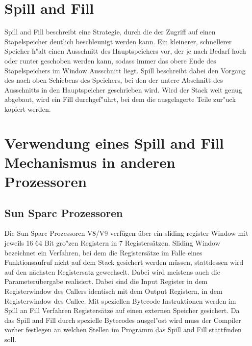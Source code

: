 \section{Spill and Fill}

Spill and Fill beschreibt eine Strategie, durch die der Zugriff auf einen Stapelspeicher deutlich beschleunigt werden kann. Ein kleinerer, schnellerer Speicher h"alt einen Ausschnitt des Hauptspeichers vor, der je nach Bedarf hoch oder runter geschoben werden kann, sodass immer das obere Ende des Stapelspeichers im Window Ausschnitt liegt. Spill beschreibt dabei den Vorgang des nach oben Schiebens des Speichers, bei den der untere Abschnitt des Ausschnitts in den Hauptspeicher geschrieben wird. Wird der Stack weit genug abgebaut, wird ein Fill durchgef"uhrt, bei dem die ausgelagerte Teile zur"uck kopiert werden.  


\section{Verwendung eines Spill and Fill Mechanismus in anderen Prozessoren}
\subsection{Sun Sparc Prozessoren}
Die Sun Sparc Prozessoren V8/V9 verf\"ugen \"uber ein sliding register Window mit jeweils 16 64 Bit gro"zen Registern in 7 Registers\"atzen. Sliding Window bezeichnet ein Verfahren, bei dem die Registers\"atze im Falle eines Funktionsaufruf nicht auf dem Stack gesichert werden m\"ussen, stattdessen wird auf den n\"achsten Registersatz gewechselt. Dabei wird meistens auch die Parameter\"ubergabe realisiert. Dabei sind die Input Register in dem Registerwindow des Callers identisch mit dem Output Registern, in dem Registerwindow des Callee.   
Mit speziellen Bytecode Instruktionen werden im Spill an Fill Verfahren Registers\"atze auf einen externen Speicher gesichert. Da das Spill and Fill durch spezielle Bytecodes ausgel"ost wird muss der Compiler vorher festlegen an welchen Stellen im Programm das Spill and Fill stattfinden soll. \cite{Gove}
